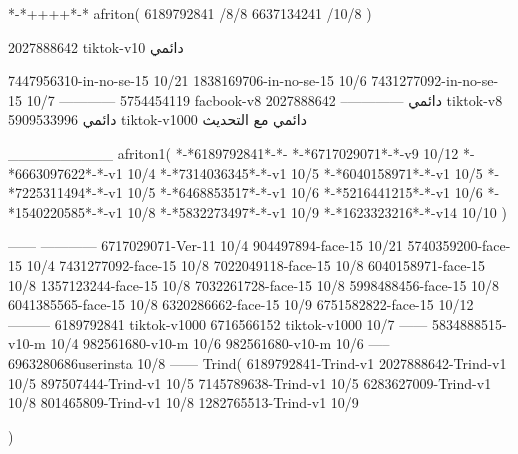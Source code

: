 *-*++++*-*
afriton(
6189792841 /8/8
6637134241 /10/8
)

2027888642 tiktok-v10
دائمي


7447956310-in-no-se-15 10/21
1838169706-in-no-se-15 10/6
7431277092-in-no-se-15 10/7
------------
5754454119 facbook-v8
دائمي
--------------
2027888642 tiktok-v8
دائمي
5909533996 tiktok-v1000
دائمي مع التحديث

__________
afriton1(
*-*6189792841*-*-
*-*6717029071*-*-v9 10/12
*-*6663097622*-*-v1 10/4
*-*7314036345*-*-v1 10/5
*-*6040158971*-*-v1 10/5
*-*7225311494*-*-v1 10/5
*-*6468853517*-*-v1 10/6
*-*5216441215*-*-v1 10/6
*-*1540220585*-*-v1 10/8
*-*5832273497*-*-v1 10/9
*-*1623323216*-*-v14 10/10
)

------
------------
6717029071-Ver-11
10/4
904497894-face-15 10/21
5740359200-face-15 10/4
7431277092-face-15 10/8
7022049118-face-15 10/8
6040158971-face-15 10/8
1357123244-face-15 10/8
7032261728-face-15 10/8
5998488456-face-15 10/8
6041385565-face-15 10/8
6320286662-face-15 10/9
6751582822-face-15 10/12
---------
6189792841 tiktok-v1000
6716566152 tiktok-v1000
10/7
------
5834888515-v10-m 10/4
982561680‏-v10-m 10/6
982561680-v10-m 10/6
-----
6963280686userinsta 10/8
------
Trind(
6189792841-Trind-v1 
2027888642-Trind-v1 10/5
897507444-Trind-v1 10/5
7145789638-Trind-v1 10/5
6283627009-Trind-v1 10/8
801465809-Trind-v1 10/8
1282765513-Trind-v1 10/9

)
